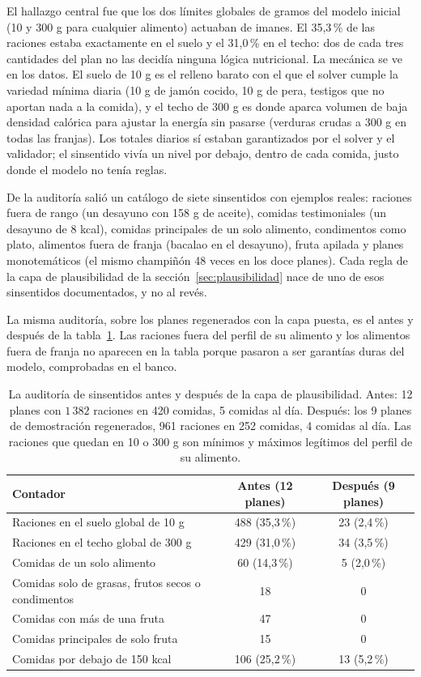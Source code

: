 El hallazgo central fue que los dos límites globales de gramos del modelo inicial (10 y 300 g para cualquier alimento) actuaban de imanes. El 35,3\,\% de las raciones estaba exactamente en el suelo y el 31,0\,\% en el techo: dos de cada tres cantidades del plan no las decidía ninguna lógica nutricional. La mecánica se ve en los datos. El suelo de 10 g es el relleno barato con el que el solver cumple la variedad mínima diaria (10 g de jamón cocido, 10 g de pera, testigos que no aportan nada a la comida), y el techo de 300 g es donde aparca volumen de baja densidad calórica para ajustar la energía sin pasarse (verduras crudas a 300 g en todas las franjas). Los totales diarios sí estaban garantizados por el solver y el validador; el sinsentido vivía un nivel por debajo, dentro de cada comida, justo donde el modelo no tenía reglas.

De la auditoría salió un catálogo de siete sinsentidos con ejemplos reales: raciones fuera de rango (un desayuno con 158 g de aceite), comidas testimoniales (un desayuno de 8 kcal), comidas principales de un solo alimento, condimentos como plato, alimentos fuera de franja (bacalao en el desayuno), fruta apilada y planes monotemáticos (el mismo champiñón 48 veces en los doce planes). Cada regla de la capa de plausibilidad de la sección~\ref{sec:plausibilidad} nace de uno de esos sinsentidos documentados, y no al revés.

La misma auditoría, sobre los planes regenerados con la capa puesta, es el antes y después de la tabla~\ref{tab:auditoria}. Las raciones fuera del perfil de su alimento y los alimentos fuera de franja no aparecen en la tabla porque pasaron a ser garantías duras del modelo, comprobadas en el banco.

\begin{table}[htbp]
\centering
\small
\begin{tabular}{|p{6.6cm}|c|c|}
\hline
\textbf{Contador} & \textbf{Antes (12 planes)} & \textbf{Después (9 planes)} \\
\hline
Raciones en el suelo global de 10 g & 488 (35,3\,\%) & 23 (2,4\,\%) \\
\hline
Raciones en el techo global de 300 g & 429 (31,0\,\%) & 34 (3,5\,\%) \\
\hline
Comidas de un solo alimento & 60 (14,3\,\%) & 5 (2,0\,\%) \\
\hline
Comidas solo de grasas, frutos secos o condimentos & 18 & 0 \\
\hline
Comidas con más de una fruta & 47 & 0 \\
\hline
Comidas principales de solo fruta & 15 & 0 \\
\hline
Comidas por debajo de 150 kcal & 106 (25,2\,\%) & 13 (5,2\,\%) \\
\hline
\end{tabular}
\caption{La auditoría de sinsentidos antes y después de la capa de plausibilidad. Antes: 12 planes con $1\,382$ raciones en 420 comidas, 5 comidas al día. Después: los 9 planes de demostración regenerados, 961 raciones en 252 comidas, 4 comidas al día. Las raciones que quedan en 10 o 300 g son mínimos y máximos legítimos del perfil de su alimento.}
\label{tab:auditoria}
\end{table}

